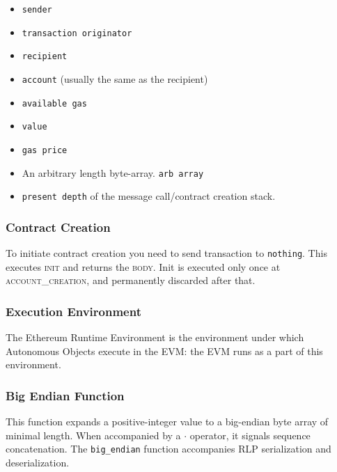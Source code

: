\documentclass[10pt,letterpaper,leqno,bibliography=totoc]{scrartcl}
\newenvironment{alphafootnotes}
{\par\edef\savedfootnotenumber{\number\value{footnote}}
\renewcommand{\thefootnote}{\alph{footnote}}
\setcounter{footnote}{0}}
{\par\setcounter{footnote}{\savedfootnotenumber}}
\begin{document}
\begin{alphafootnotes}
\begin{multicols*}{2}
\begin{itemize}
	\item \texttt{sender}
	\item \texttt{transaction originator} 
	\item \texttt{recipient}
	\item \texttt{account} (usually the same as the recipient) 
	\item \texttt{available gas} 
	\item \texttt{value}
	\item \texttt{gas price}
	\item An arbitrary length byte-array. \texttt{arb array}
	\item \texttt{present depth} of the message call/contract creation stack.
\end{itemize}


				\subsubsection{Contract Creation}
				To initiate contract creation you need to send transaction to \texttt{nothing}. This executes \textsc{init} and returns the \textsc{body}. Init is executed only once at \textsc{account\_creation}, and permanently discarded after that.		


				\subsubsection{Execution Environment}
					 The Ethereum Runtime Environment is the environment under which Autonomous Objects execute in the EVM: the EVM runs as a part of this environment.  


				\subsubsection{Big Endian Function} This function expands a positive-integer value to a big-endian byte array of minimal length. When accompanied by a $\cdot$ operator, it signals sequence concatenation. The \texttt{big\_endian} function  accompanies RLP serialization and deserialization.



\end{multicols*}
\end{alphafootnotes}
\end{document}
